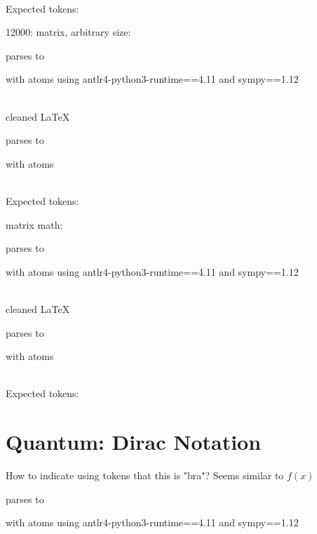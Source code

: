 \documentclass{article}
\begin{document}
\ \\
Expected tokens:


\hrulefill

12000:
matrix, arbitrary size:

parses to

with atoms
using antlr4-python3-runtime==4.11 and sympy==1.12

\ \\
cleaned \LaTeX

parses to

with atoms


\ \\
Expected tokens:



\hrulefill


matrix math:

parses to

with atoms
using antlr4-python3-runtime==4.11 and sympy==1.12

\ \\
cleaned \LaTeX

parses to

with atoms


\ \\
Expected tokens:



\hrulefill


\section{Quantum: Dirac Notation}

How to indicate using tokens that this is "bra"? Seems similar to $f(x)$


parses to

with atoms
using antlr4-python3-runtime==4.11 and sympy==1.12
\end{document}
